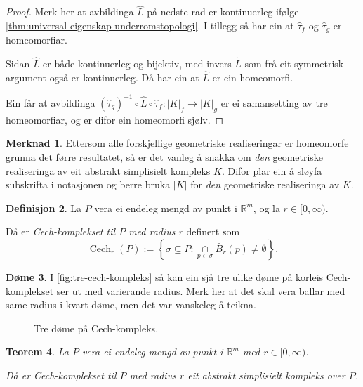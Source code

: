 \documentclass[a4paper, 12pt, norsk]{article}
\theoremstyle{plain}
\newtheorem{theorem}{Teorem}[section]
\theoremstyle{definition}
\newtheorem{definition}[theorem]{Definisjon}
\newtheorem{example}[theorem]{Døme}
\newtheorem{remark}[theorem]{Merknad}
\newcommand{\Rb}{\mathbb{R}}
\newcommand{\intersect}{ \mathop{\cap}\limits }
\newcommand{\gr}[1]{ \lvert #1 \rvert } %
\DeclareMathOperator{\Cech}{Cech} %
\begin{document}
\begin{proof}
	Merk her at avbildinga \( \hat{L} \) på nedste rad er kontinuerleg ifølge \autoref{thm:universal-eigenskap-underromstopologi}. I tillegg så har ein at \( \hat{\tau}_f \) og \( \hat{\tau}_g \) er homeomorfiar.

	Sidan $\hat{L}$ er både kontinuerleg og bijektiv, med invers $\tilde{L}$ som frå eit symmetrisk argument også er kontinuerleg. Då har ein at $\hat{L}$ er ein homeomorfi.

	Ein får at avbildinga $(\hat{\tau}_g)^{-1}\circ\hat{L}\circ\hat{\tau}_f:\gr{K}_f\to\gr{K}_g$ er ei samansetting av tre homeomorfiar, og er difor ein homeomorfi sjølv.
\end{proof}

\begin{remark}
	Ettersom alle forskjellige geometriske realiseringar er homeomorfe grunna det førre resultatet, så er det vanleg å snakka om \emph{den} geometriske realiseringa av eit abstrakt simplisielt kompleks $K$. Difor plar ein å sløyfa subskrifta i notasjonen og berre bruka $\gr{K}$ for \emph{den} geometriske realiseringa av $K$.
\end{remark}

\begin{definition} \label{def:cech}
	La \( P \) vera ei endeleg mengd av punkt i \( \Rb^m \), og la \( r \in [0, \infty) \).
	
	Då er \emph{Cech-komplekset til $P$ med radius $r$} definert som
	\[
		\Cech_r(P) := \left\{\sigma\subseteq P : \intersect_{p\in\sigma}\bar{B}_r(p)\neq\emptyset\right\}.
	\]
\end{definition}

\begin{example}
	 I \autoref{fig:tre-cech-kompleks} så kan ein sjå tre ulike døme på korleis Cech-komplekset ser ut med varierande radius. Merk her at det skal vera ballar med same radius i kvart døme, men det var vanskeleg å teikna.
	\begin{figure}[htbp]
		\begin{center}
			
		\end{center}
		\caption{Tre døme på Cech-kompleks.}
		\label{fig:tre-cech-kompleks}
	\end{figure}
\end{example}

\begin{theorem} \label{thm:CASK}
	La \( P \) vera ei endeleg mengd av punkt i \( \Rb^m \) med \( r \in [0, \infty) \).
	
	Då er Cech-komplekset til $P$ med radius $r$ eit abstrakt simplisielt kompleks over $P$.
\end{theorem}
\end{document}
